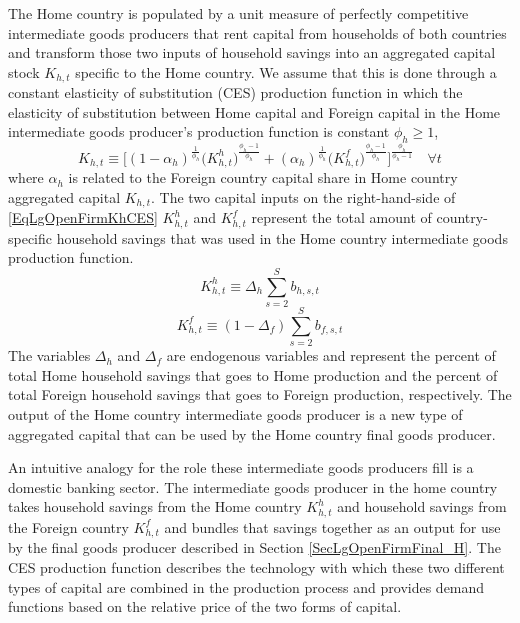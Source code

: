 \documentclass[letterpaper,12pt]{article}
\theoremstyle{definition}
\begin{document}
    The Home country is populated by a unit measure of perfectly competitive intermediate goods producers that rent capital from households of both countries and transform those two inputs of household savings into an aggregated capital stock $K_{h,t}$ specific to the Home country. We assume that this is done through a constant elasticity of substitution (CES) production function in which the elasticity of substitution between Home capital and Foreign capital in the Home intermediate goods producer's production function is constant $\phi_h\geq 1$,
    \begin{equation}\label{EqLgOpenFirmKhCES}
      K_{h,t}\equiv \biggl[(1 - \alpha_h)^\frac{1}{\phi_h}\bigl(K^h_{h,t}\bigr)^\frac{\phi_h-1}{\phi_h} + (\alpha_h)^\frac{1}{\phi_h}\bigl(K^f_{h,t}\bigr)^\frac{\phi_h-1}{\phi_h}\biggr]^\frac{\phi_h}{\phi_h-1} \quad\forall t
    \end{equation}
    where $\alpha_h$ is related to the Foreign country capital share in Home country aggregated capital $K_{h,t}$. The two capital inputs on the right-hand-side of \eqref{EqLgOpenFirmKhCES} $K^h_{h,t}$ and $K^f_{h,t}$ represent the total amount of country-specific household savings that was used in the Home country intermediate goods production function.
    \begin{equation}\label{EqLgOpenFirmKhh}
      K^h_{h,t} \equiv \Delta_h \sum_{s=2}^S b_{h,s,t}
    \end{equation}
    \begin{equation}\label{EqLgOpenFirmKhf}
      K^f_{h,t} \equiv (1 - \Delta_f)\sum_{s=2}^S b_{f,s,t}
    \end{equation}
    The variables $\Delta_h$ and $\Delta_f$ are endogenous variables and represent the percent of total Home household savings that goes to Home production and the percent of total Foreign household savings that goes to Foreign production, respectively. The output of the Home country intermediate goods producer is a new type of aggregated capital that can be used by the Home country final goods producer.

    An intuitive analogy for the role these intermediate goods producers fill is a domestic banking sector. The intermediate goods producer in the home country takes household savings from the Home country $K^h_{h,t}$ and household savings from the Foreign country $K^f_{h,t}$ and bundles that savings together as an output for use by the final goods producer described in Section \ref{SecLgOpenFirmFinal_H}. The CES production function describes the technology with which these two different types of capital are combined in the production process and provides demand functions based on the relative price of the two forms of capital.
\end{document}
